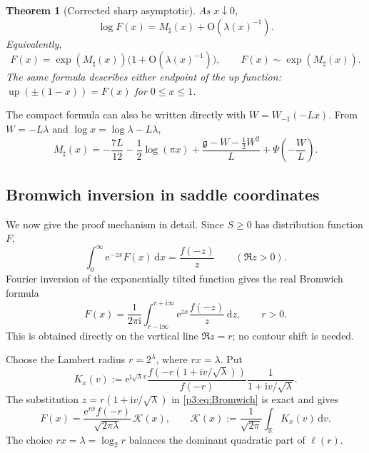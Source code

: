 \documentclass[11pt]{article}
\numberwithin{equation}{section}
\newtheorem{theorem}{Theorem}[section]
\theoremstyle{definition}
\theoremstyle{remark}
\newcommand{\R}{\mathbb R}
\newcommand{\upf}{\operatorname{up}}
\newcommand{\dd}{\,\mathrm d}
\newcommand{\e}{\mathrm e}
\newcommand{\ii}{\mathrm i}
\newcommand{\Oh}{\mathrm O}
\begin{document}
\begin{theorem}[Corrected sharp asymptotic]\label{p3:thm:sharp-asymptotic}
As $x\downarrow0$,
\begin{equation}\label{p3:eq:sharp-asymptotic}
 \boxed{\log F(x)=M_\sharp(x)+\Oh(\lambda(x)^{-1}).}
\end{equation}
Equivalently,
\begin{equation}\label{p3:eq:sharp-F-equivalent}
 F(x)=\exp(M_\sharp(x))\bigl(1+\Oh(\lambda(x)^{-1})\bigr),
 \qquad
 F(x)\sim\exp(M_\sharp(x)).
\end{equation}
The same formula describes either endpoint of the up function:
$\upf(\pm(1-x))=F(x)$ for $0\le x\le1$.
\end{theorem}

The compact formula can also be written directly with
$W=W_{-1}(-Lx)$.  From $W=-L\lambda$ and
$\log x=\log\lambda-L\lambda$,
\begin{equation}\label{p3:eq:Msharp-W}
 M_\sharp(x)=
 -\frac{7L}{12}-\frac12\log(\pi x)
 +\frac{\mathfrak g-W-\tfrac12W^2}{L}
 +\Psi\!\left(-\frac WL\right).
\end{equation}

\subsection{Bromwich inversion in saddle coordinates}

We now give the proof mechanism in detail.  Since $S\ge0$ has distribution
function $F$,
\begin{equation}\label{p3:eq:Laplace-CDF}
 \int_0^\infty \e^{-zx}F(x)\dd x=\frac{f(-z)}{z}
 \qquad(\Re z>0).
\end{equation}
Fourier inversion of the exponentially tilted function gives the real
Bromwich formula
\begin{equation}\label{p3:eq:Bromwich}
 F(x)=\frac{1}{2\pi\ii}
 \int_{r-\ii\infty}^{r+\ii\infty}
   \e^{zx}\frac{f(-z)}{z}\dd z,
 \qquad r>0.
\end{equation}
This is obtained directly on the vertical line $\Re z=r$; no contour shift is
needed.

Choose the Lambert radius $r=2^\lambda$, where $rx=\lambda$.  Put
\begin{equation}\label{p3:eq:scaled-kernel}
 K_{x}(v):=
 \e^{\ii\sqrt\lambda v}
 \frac{f\!\left(-r(1+\ii v/\sqrt\lambda)\right)}{f(-r)}
 \frac{1}{1+\ii v/\sqrt\lambda}.
\end{equation}
The substitution $z=r(1+\ii v/\sqrt\lambda)$ in
\eqref{p3:eq:Bromwich} is exact and gives
\begin{equation}\label{p3:eq:exact-saddle-factorization}
\boxed{
 F(x)=\frac{\e^{rx}f(-r)}{\sqrt{2\pi\lambda}}\,
 \mathcal K(x),
 \qquad
 \mathcal K(x):=\frac1{\sqrt{2\pi}}
   \int_{\R}K_x(v)\dd v.}
\end{equation}
The choice $rx=\lambda=\log_2r$ balances the dominant quadratic part of
$\ell(r)$.
\end{document}
